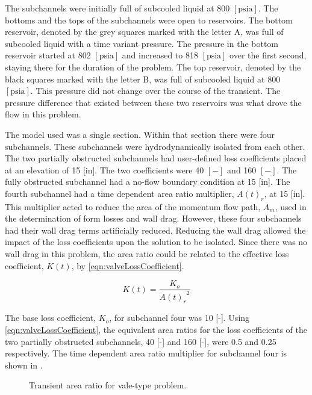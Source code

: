 The subchannels were initially full of subcooled liquid at 800 $[ \text{psia}] $.
The bottoms and the tops of the subchannels were open to reservoirs.
The bottom reservoir, denoted by the grey squares marked with the letter A, was full of subcooled liquid with a time variant pressure.
The pressure in the bottom reservoir started at 802 $[ \text{psia}]$ and increased to 818 $[ \text{psia}]$ over the first second, staying there for the duration of the problem.
The top reservoir, denoted by the black squares marked with the letter B, was full of subcooled liquid at 800 $[\text{psia} ] $.
This pressure did not change over the course of the transient.
The pressure difference that existed between these two reservoirs was what drove the flow in this problem.

The model used was a single section.
Within that section there were four subchannels.
These subchannels were hydrodynamically isolated from each other.
The two partially obstructed subchannels had user-defined loss coefficients placed at an elevation of 15 [in].
The two coefficients were 40 $[-]$ and 160 $[-]$.
The fully obstructed subchannel had a no-flow boundary condition at 15 [in].
The fourth subchannel had a time dependent area ratio multiplier, $A(t)_r$, at 15 [in].
This multiplier acted to reduce the area of the momentum flow path, $A_m$, used in the determination of form losses and wall drag.
However, these four subchannels had their wall drag terms artificially reduced.
Reducing the wall drag allowed the impact of the loss coefficients upon the solution to be isolated.
Since there was no wall drag in this problem, the area ratio could be related to the effective loss coefficient, $K(t)$, by \eqref{eqn:valveLossCoefficient}.

\begin{equation}
\label{eqn:valveLossCoefficient}
K(t) = \frac{K_{o}}{{A(t)_r}^2}
\end{equation}

The base loss coefficient, $K_o$, for subchannel four was 10 [-].
Using \eqref{eqn:valveLossCoefficient}, the equivalent area ratios for the loss coefficients of the two partially obstructed subchannels, 40 [-] and 160 [-], were 0.5 and 0.25 respectively.
The time dependent area ratio multiplier for subchannel four is shown in .

\begin{figure}[h!tb]
\centering

\caption{Transient area ratio for vale-type problem.}
\label{fig:valveTransientArea}
\end{figure}

